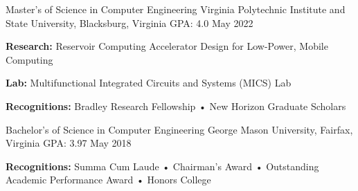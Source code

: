 


\begin{cventries}

\cventry
{Master's of Science in Computer Engineering} %
{Virginia Polytechnic Institute and State University, Blacksburg, Virginia} %
{GPA: 4.0 } %
{May 2022} %
{
\begin{cvitems}
\item {\textbf{Research:} Reservoir Computing Accelerator Design for Low-Power, Mobile Computing}
\item {\textbf{Lab:} Multifunctional Integrated Circuits and Systems (MICS) Lab}
\item {\textbf{Recognitions:} Bradley Research Fellowship • New Horizon Graduate Scholars}
\end{cvitems}
}
\cventry
{Bachelor's of Science in Computer Engineering} %
{George Mason University, Fairfax, Virginia} %
{GPA: 3.97 } %
{May 2018} %
{
\begin{cvitems}
\item {\textbf{Recognitions:} Summa Cum Laude • Chairman's Award • Outstanding Academic Performance Award • Honors College}
\end{cvitems}
}


\end{cventries}